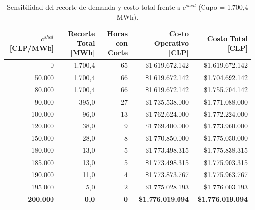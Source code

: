 \documentclass[10pt,letterpaper]{article}
\begin{document}
\begin{table}[H]
\centering
\caption{Sensibilidad del recorte de demanda y costo total frente a $c^{shed}$ (Cupo = 1.700,4 MWh).}
\label{tab:cshed_sweep}
\setlength{\tabcolsep}{4pt}
\small
\begin{tabular}{rrrrr}
\toprule
$c^{shed}$ \textbf{[CLP/MWh]} & \textbf{Recorte Total [MWh]} & \textbf{Horas con Corte} & \textbf{Costo Operativo [CLP]} & \textbf{Costo Total [CLP]} \\
\midrule
0 & 1.700,4 & 65 & \$1.619.672.142 & \$1.619.672.142 \\
50.000 & 1.700,4 & 66 & \$1.619.672.142 & \$1.704.692.142 \\
80.000 & 1.700,4 & 66 & \$1.619.672.142 & \$1.755.704.142 \\
90.000 & 395,0 & 27 & \$1.735.538.000 & \$1.771.088.000 \\
100.000 & 96,0 & 13 & \$1.762.624.000 & \$1.772.224.000 \\
120.000 & 38,0 & 9 & \$1.769.400.000 & \$1.773.960.000 \\
150.000 & 28,0 & 8 & \$1.770.850.000 & \$1.775.050.000 \\
180.000 & 13,0 & 5 & \$1.773.498.315 & \$1.775.838.315 \\
185.000 & 13,0 & 5 & \$1.773.498.315 & \$1.775.903.315 \\
190.000 & 11,0 & 4 & \$1.773.873.767 & \$1.775.963.767 \\
195.000 & 5,0 & 2 & \$1.775.028.193 & \$1.776.003.193 \\
\textbf{200.000} & \textbf{0,0} & \textbf{0} & \textbf{\$1.776.019.094} & \textbf{\$1.776.019.094} \\
\bottomrule
\end{tabular}
\end{table}
\end{document}
